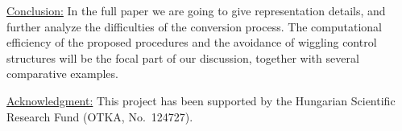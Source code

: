 \documentclass{article}
\begin{document}
\vspace{10pt}
\noindent\underline{Conclusion:}\vspace{0.2em}\newline
In the full paper we are going to give representation details, and
further analyze the difficulties of the conversion process.
The computational efficiency of the proposed procedures
and the avoidance of wiggling control structures
will be the focal part of our discussion,
together with several comparative examples.

\vspace{1em}
\noindent\underline{Acknowledgment:}\vspace{0.2em}\newline
This project has been supported by the Hungarian Scientific Research Fund (OTKA, No.~124727).
\end{document}
